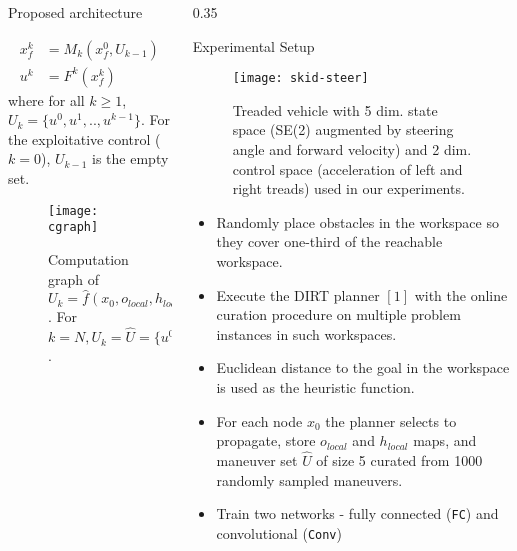 \begin{columns}[t]
\begin{column}{0.65\textwidth}
\begin{block}{\large Proposed architecture}
\begin{itemize}
			\begin{align*}
				x_f^k &= M_k(x_f^0,U_{k-1}) \\
				u^{k} &= F^k(x_f^k) 
			\end{align*}
			\vspace{-.1in}
			where for all $k \geq 1$, $U_k = \{u^0,u^1,..,u^{k-1}\}$. For the exploitative control ($k=0$), $U_{k-1}$ is the empty set.
			\vspace{0.1in}
			\end{itemize}			
			\begin{figure}[h!]
				\centering
				\texttt{[image: cgraph]}
				\vspace{-.1in}
				\caption{Computation graph of $U_k = \hat{f}(x_0,o_{local},h_{local})$. For $k=N, U_k = \hat{U} = \{u^0,\cdots,u^N\}$.\vspace{-.15in}}
				\label{fig:cgraph}
			\end{figure}
			\vspace{-.1in}
		\end{block}
	\end{column}
	\begin{column} {0.35\textwidth}
		\begin{block}{\large Experimental Setup}
		\begin{figure}[h!]
			\centering
			\texttt{[image: skid-steer]}
			\vspace{-.1in}
			\caption{Treaded vehicle with 5 dim. state space (SE(2) augmented by steering angle and forward velocity) and 2 dim. control space (acceleration of left and right treads) used in our experiments.}
		\end{figure}
		\begin{itemize}
			\item Randomly place obstacles in the workspace so they cover one-third of the reachable workspace. 
			\item Execute the DIRT planner $[1]$ with the online curation procedure on multiple problem instances in such workspaces. 
			\item Euclidean distance to the goal in the workspace is used as the heuristic function. %
			\item For each node $x_0$ the planner selects to propagate, store $o_{local}$ and $h_{local}$ maps, and maneuver set $\hat{U}$ of size 5 curated from 1000 randomly sampled maneuvers.
			\item Train two networks - fully connected (\texttt{FC}) and convolutional (\texttt{Conv})

\end{itemize}
\end{block}
\end{column}
\end{columns}
